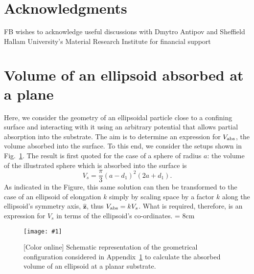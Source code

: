 \documentclass[aps,10pt,twocolumn]{revtex4}
\newcommand{\vecth}[1]{ \mathbf{\hat{#1} } }
\newlength{\picW}   %
\newcommand{\pic}[1]{\texttt{[image: \#1]}}
\begin{document}
\section*{Acknowledgments}
FB wishes to acknowledge useful discussions with Dmytro Antipov and Sheffield Hallam University's Material
Research Institute for financial support

\appendix
\section{Volume of an ellipsoid absorbed at a plane}
\label{app:A}
Here, we consider the geometry of an ellipsoidal particle close to a confining surface and
interacting with it using an arbitrary potential that allows partial absorption into the substrate. The aim is to
determine an expression for $V_{\rm abs}$, the volume absorbed into the surface. To this end, we consider the
setups shown in Fig.~\ref{fig:scalingVe-Vs}. The result is first quoted for the case of a sphere of radius $a$:
the volume of the illustrated sphere which is absorbed into the surface is
\begin{equation} \label{eqn:Vs}
    V_s = \frac{\pi}{3}(a-d_1)^2(2a+d_1).
\end{equation}
As indicated in the Figure, this same solution can then be transformed to the case of an ellipsoid of elongation
$k$ simply by scaling space by a factor $k$ along the ellipsoid's symmetry axis, $\vecth{z}$, thus $V_{\rm abs} =
kV_s$. What is required, therefore, is an expression for $V_s$ in terms of the ellipsoid's co-ordinates.
\picW = 8cm
\begin{figure}[h]
    \centering
    \pic{fig_12.ps}
    \caption{[Color online] Schematic representation of the geometrical configuration considered in
    Appendix~\ref{app:A} to
    calculate the absorbed volume of an ellipsoid at a planar substrate.}
    \label{fig:scalingVe-Vs}
\end{figure}
\end{document}
